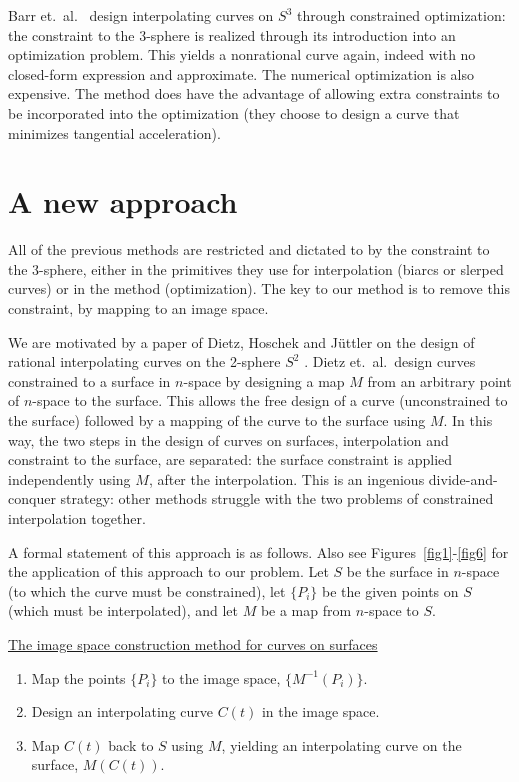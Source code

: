 Barr et.\ al.\ \cite{barr92} design interpolating curves on $S^3$ 
through constrained optimization: the constraint to the 3-sphere 
is realized through its introduction into an optimization problem.
This yields a nonrational curve again, indeed with no closed-form expression
and approximate.
The numerical optimization is also expensive.
The method does have the advantage of allowing extra constraints 
to be incorporated into the optimization (they choose to design a curve
that minimizes tangential acceleration).

\section{A new approach}
\label{sec:general}

All of the previous methods are restricted and dictated to by the constraint 
to the 3-sphere,
either in the primitives they use for interpolation (biarcs or slerped curves)
or in the method (optimization).
The key to our method is to remove this constraint, by mapping to an image space.

We are motivated by a paper of Dietz, Hoschek and J\"{u}ttler \cite{dietz93}
on the design of rational interpolating curves on the 2-sphere $S^2$ 
\cite{dietz93}.
Dietz et.\ al.\ design curves constrained to a surface in $n$-space by 
designing a map $M$ from an arbitrary point of $n$-space to the surface.
This allows the free design of a curve (unconstrained to the surface)
followed by a mapping of the curve to the surface using $M$.
In this way, the two steps in the design of curves on surfaces,
interpolation and constraint to the surface, are separated:
the surface constraint is applied independently using $M$, 
after the interpolation.
This is an ingenious divide-and-conquer strategy: other methods
struggle with the two problems of constrained interpolation together.

A formal statement of this approach is as follows.
Also see Figures~\ref{fig1}-\ref{fig6} for the application of this
approach to our problem.
Let $S$ be the surface in $n$-space (to which the curve must be constrained), 
let $\{P_i\}$ be the given points on $S$ (which must be interpolated), 
and let $M$ be a map from $n$-space to $S$.

\vspace{.2in}

\centerline{\underline{The image space construction method for curves on surfaces}}
\begin{enumerate}
\item Map the points $\{P_i\}$ to the image space, $\{M^{-1}(P_i)\}$.
\item Design an interpolating curve $C(t)$ in the image space.
\item Map $C(t)$ back to $S$ using $M$, yielding an interpolating curve on 
	the surface, $M(C(t))$.
\end{enumerate}


